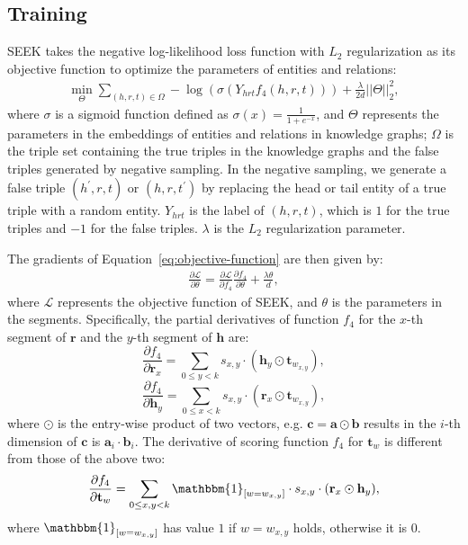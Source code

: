 \documentclass[11pt,a4paper]{article}
\newcommand{\SegVec}[1]{\mathbf{#1}}
\begin{document}
\subsection{Training}
SEEK takes the negative log-likelihood loss function with $L_2$ regularization as its objective function to optimize the parameters of entities and relations:
\begin{align}
\min_{\Theta} \sum_{(h, r, t) \in \Omega}-\log (\sigma (Y_{hrt}f_4(h, r, t))) + \frac{\lambda}{2d} ||\Theta||^2_2,
\label{eq:objective-function}
\end{align}
where $\sigma$ is a sigmoid function defined as $\sigma(x) = \frac{1}{1 + e^{-x}}$, and $\Theta$ represents the parameters in the embeddings of entities and relations in knowledge graphs; $\Omega$ is the triple set containing the true triples in the knowledge graphs and the false triples generated by negative sampling. In the negative sampling, we generate a false triple $(h^{'}, r, t)$ or $(h, r, t^{'})$ by replacing the head or tail entity of a true triple with a random entity. $Y_{hrt}$ is the label of $(h, r, t)$, which is $1$ for the true triples and $-1$ for the false triples. $\lambda$ is the $L_2$ regularization parameter.


The gradients of Equation~\ref{eq:objective-function} are then given by:
\begin{align}
\frac{\partial \mathcal{L}}{\partial \theta} = \frac{\partial \mathcal{L}}{\partial f_4}\frac{\partial f_4}{\partial \theta} + \frac{\lambda \theta}{d},
\end{align}
where $\mathcal{L}$ represents the objective function of SEEK, and $\theta$ is the parameters in the segments. Specifically, the partial derivatives of function $f_4$ for the $x$-th segment of $\SegVec{r}$ and the $y$-th segment of $\SegVec{h}$ are:
$$\frac{\partial f_4}{\partial \SegVec{r}_x} = \sum_{0 \leq y < k} s_{x, y} \cdot (\SegVec{h}_y \odot \SegVec{t}_{w_{x, y}}),$$
$$\frac{\partial f_4}{\partial \SegVec{h}_y} = \sum_{0 \leq x < k} s_{x, y} \cdot (\SegVec{r}_x \odot \SegVec{t}_{w_{x, y}}),$$
where $\odot$ is the entry-wise product of two vectors, e.g. $\SegVec{c} = \SegVec{a} \odot \SegVec{b}$ 
results in the $i$-th dimension of $\SegVec{c}$ is $\SegVec{a}_i \cdot \SegVec{b}_i$.
The derivative of scoring function $f_4$ for $\SegVec{t}_{w}$ is different from those of the above two:
$$\frac{\partial f_4}{\partial \SegVec{t}_w} = \sum_{0 \leq x, y < k} \mathbbm{1}_{[w=w_{x, y}]} \cdot s_{x, y} \cdot (\SegVec{r}_x \odot \SegVec{h}_{y}),$$
where $\mathbbm{1}_{[w=w_{x, y}]}$ has value $1$ if $w=w_{x, y}$ holds, otherwise it is $0$.
\end{document}
